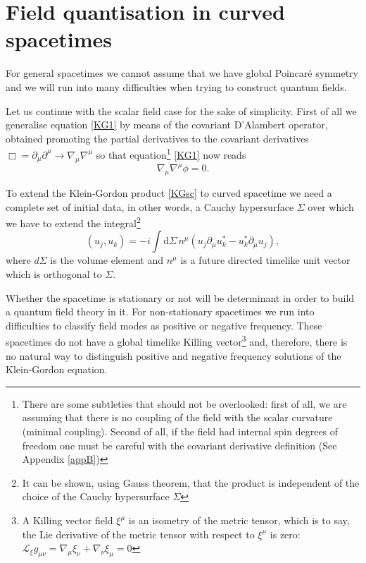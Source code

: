 \section{Field quantisation in curved spacetimes}

For general spacetimes we cannot assume that we have global Poincar\'e symmetry and we will run into many difficulties when trying to construct quantum fields.

Let us continue with the scalar field case for the sake of simplicity. First of all we generalise equation \eqref{KG1} by means of the covariant D'Alambert operator, obtained promoting the partial derivatives to the covariant derivatives $\Box =\partial_\mu\partial^\mu\rightarrow \nabla_\mu\nabla^\mu$ so that  equation\footnote{There are some subtleties that should not be overlooked: first of all, we are assuming that there is no coupling of the field with the scalar curvature (minimal coupling). Second of all, if the field had internal spin degrees of freedom one must be careful with the covariant derivative definition (See Appendix \ref{appB})} \eqref{KG1} now reads
\begin{equation}
\nabla_\mu\nabla^\mu \phi =0.
\end{equation}
 
 To extend the Klein-Gordon product \eqref{KGsc} to curved spacetime we need a complete set of initial data, in other words, a Cauchy hypersurface $\Sigma$ over which we have to extend the integral\footnote{It can be shown, using Gauss theorem, that the product is independent of the choice of the Cauchy hypersurface $\Sigma$}
 \begin{equation}\label{KGscc}
(u_j,u_k)=-i\int \text{d}\Sigma\, n^\mu\left(u_j\partial_\mu u_k^*-u_k^*\partial_\mu u_j\right),
 \end{equation}
where $d\Sigma$ is the volume element and $n^\mu$ is a future directed timelike unit vector which is orthogonal to $\Sigma$.

Whether the spacetime is stationary or not will be determinant in order to build a quantum field theory in it. For non-stationary spacetimes we run into difficulties to classify field modes as positive or negative frequency. These spacetimes do not have a global timelike Killing vector\footnote{A Killing vector field $\xi^\mu$ is an isometry of the metric tensor, which is to say, the Lie derivative of the metric tensor with respect to $\xi^\mu$ is zero: $\mathcal{L}_{\xi}g_{\mu\nu}=\nabla_\mu\xi_{\nu}+\nabla_\nu\xi_{\mu}=0$} and, therefore, there is no natural way to distinguish positive and negative frequency solutions of the Klein-Gordon equation.

